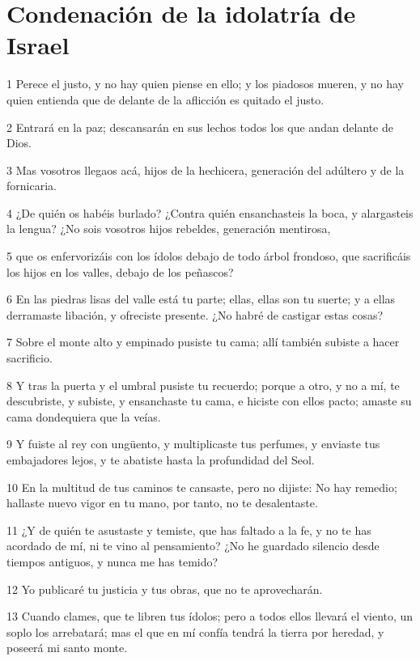 \section*{Condenación de la idolatría de Israel}

\par 1 Perece el justo, y no hay quien piense en ello; y los piadosos mueren, y no hay quien entienda que de delante de la aflicción es quitado el justo.
\par 2 Entrará en la paz; descansarán en sus lechos todos los que andan delante de Dios.
\par 3 Mas vosotros llegaos acá, hijos de la hechicera, generación del adúltero y de la fornicaria.
\par 4 ¿De quién os habéis burlado? ¿Contra quién ensanchasteis la boca, y alargasteis la lengua? ¿No sois vosotros hijos rebeldes, generación mentirosa,
\par 5 que os enfervorizáis con los ídolos debajo de todo árbol frondoso, que sacrificáis los hijos en los valles, debajo de los peñascos?
\par 6 En las piedras lisas del valle está tu parte; ellas, ellas son tu suerte; y a ellas derramaste libación, y ofreciste presente. ¿No habré de castigar estas cosas?
\par 7 Sobre el monte alto y empinado pusiste tu cama; allí también subiste a hacer sacrificio.
\par 8 Y tras la puerta y el umbral pusiste tu recuerdo; porque a otro, y no a mí, te descubriste, y subiste, y ensanchaste tu cama, e hiciste con ellos pacto; amaste su cama dondequiera que la veías.
\par 9 Y fuiste al rey con ungüento, y multiplicaste tus perfumes, y enviaste tus embajadores lejos, y te abatiste hasta la profundidad del Seol.
\par 10 En la multitud de tus caminos te cansaste, pero no dijiste: No hay remedio; hallaste nuevo vigor en tu mano, por tanto, no te desalentaste.
\par 11 ¿Y de quién te asustaste y temiste, que has faltado a la fe, y no te has acordado de mí, ni te vino al pensamiento? ¿No he guardado silencio desde tiempos antiguos, y nunca me has temido?
\par 12 Yo publicaré tu justicia y tus obras, que no te aprovecharán.
\par 13 Cuando clames, que te libren tus ídolos; pero a todos ellos llevará el viento, un soplo los arrebatará; mas el que en mí confía tendrá la tierra por heredad, y poseerá mi santo monte.

